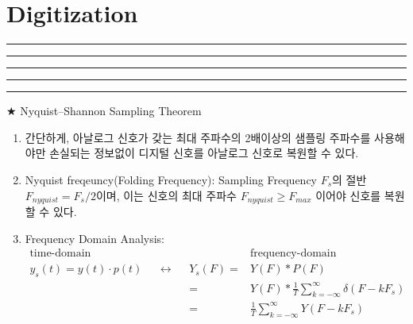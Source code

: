 \setcounter{chapter}{7}
\setcounter{section}{0}
\section{Digitization}
\vspace{-8pt} \hrule \hrule \hrule \hrule \hrule  \vspace{12pt}
$\bigstar$ Nyquist–Shannon Sampling Theorem
\begin{enumerate}
	\item 간단하게, 아날로그 신호가 갖는 최대 주파수의 2배이상의 샘플링 주파수를 사용해야만 손실되는 정보없이 디지털 신호를 아날로그 신호로 복원할 수 있다.
	\item Nyquist freqeuncy(Folding Frequency): Sampling Frequency $F_s$의 절반 $F_{nyquist}=F_s/2$이며, 이는 신호의 최대 주파수 $F_{nyquist} \geq F_{max} $ 이어야 신호를 복원 할 수 있다. 
	\item Frequency Domain Analysis:
	\begin{align*}
	    \text{time-domain}& &&&&\text{frequency-domain}\\
		y_s(t) = y(t)\cdot p(t) & & \leftrightarrow & &Y_{s}(F) = &Y(F) \ast P(F) \\
		&&&&=& Y(F) \ast \frac{1}{T} \sum_{k =-\infty}^{\infty}\delta(F-kF_s)\\
		&&&&=& \frac{1}{T} \sum_{k =-\infty}^{\infty} Y(F-kF_{s})
	\end{align*}
\end{enumerate}

